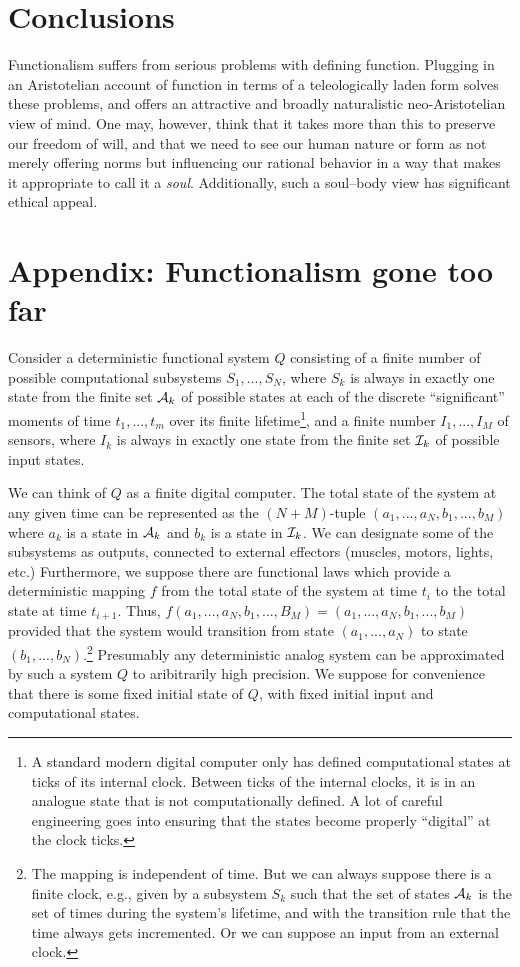 \section{Conclusions}
Functionalism suffers from serious problems with defining function. Plugging in an Aristotelian account
of function in terms of a teleologically laden form solves these problems, and offers an attractive and
broadly naturalistic neo-Aristotelian view of mind. One may, however, think that it takes more than this
to preserve our freedom of will, and that we need to see our human nature or form as not merely offering norms but influencing
our rational behavior in a way that makes it appropriate to call it a \textit{soul}. Additionally, such a soul--body
view has significant ethical appeal.

\section*{Appendix: Functionalism gone too far}
Consider a deterministic functional system $Q$ consisting of a 
finite number of possible computational subsystems $S_1,...,S_N$, where $S_k$ is always in exactly one state from the finite set $\mathcal A_k$
of possible states at each of the discrete ``significant'' moments of time $t_1,...,t_m$ over its finite lifetime\footnote{A standard modern digital computer only has defined 
computational states at ticks of its internal clock. Between ticks of the internal clocks, it is in an analogue state that is not
computationally defined. A lot of careful engineering goes into ensuring that the states become properly ``digital'' at the clock ticks.}, and 
a finite number $I_1,...,I_M$ of sensors, where $I_k$ is always in exactly one state from the finite set $\mathcal I_k$ of possible input
states.

We can think of $Q$ as a finite digital computer. The total state of the system at any given time can be represented as the
$(N+M)$-tuple $(a_1,...,a_N,b_1,...,b_M)$ where $a_k$ is a state in $\mathcal A_k$ and $b_k$ is a state in $\mathcal I_k$. We can designate some of
the subsystems as outputs, connected to external effectors (muscles, motors, lights, etc.)  Furthermore, we suppose there are functional laws which provide a 
deterministic mapping $f$ from the total state of the system at time $t_i$ to the total state at time $t_{i+1}$. Thus, $f(a_1,...,a_N,b_1,...,B_M)= (a_1,...,a_N,b_1,...,b_M)$ 
provided that the system would transition from state $(a_1,...,a_N)$ to state $(b_1,...,b_N)$.\footnote{The mapping is independent of time. But we 
can always suppose there is a finite clock, e.g., given by a subsystem $S_k$ such that the set of states $\mathcal A_k$ is
the set of times during the system's lifetime, and with the transition rule that the time always gets incremented. Or we can suppose an input
from an external clock.} Presumably any deterministic analog system can be approximated by such a system $Q$ to aribitrarily high precision.
We suppose for convenience that there is some fixed initial state of $Q$, with fixed initial input and computational states.

